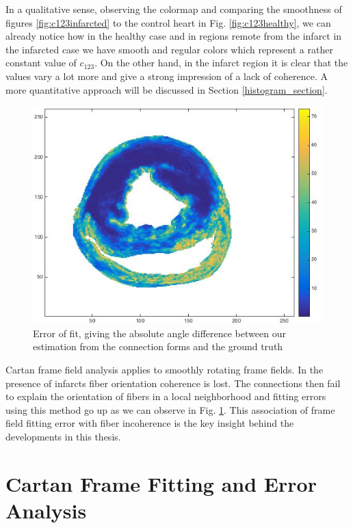 In a qualitative sense, observing the colormap and comparing the smoothness of figures \ref{fig:c123infarcted} to the control heart in Fig. \ref{fig:c123healthy}, we can already notice how in the healthy case and in regions remote from the infarct in the infarcted case we have smooth and regular colors which represent a rather constant value of $c_{123}$. On the other hand, in the infarct region it is clear that the values vary a lot more and give a strong impression of a lack of coherence. A more quantitative approach will be discussed in Section \ref{histogram_section}.
\begin{figure}
    \centering
    \includegraphics[width=\textwidth]{figures/pig4_error_of_fit_slice_19}
    \caption{Error of fit, giving the absolute angle difference between our estimation from the connection forms and the ground truth}
    \label{fig:error_of_fit}
\end{figure}
 
Cartan frame field analysis applies to smoothly rotating frame fields. In the presence of infarcts fiber orientation coherence is lost. The connections then fail to explain the orientation of fibers in a local neighborhood and fitting errors using this method go up as we can observe in Fig. \ref{fig:error_of_fit}. This association of frame field fitting error with fiber incoherence is the key insight behind the developments in this thesis.

\section{Cartan Frame Fitting and Error Analysis}

